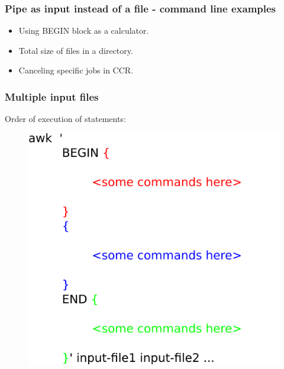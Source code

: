 \documentclass[xcolor=svgnames]{beamer}
\begin{document}
\begin{frame}
    \frametitle{Pipe as input instead of a file - command line examples}
    \begin{itemize}
        \item Using BEGIN block as a calculator.
        \item Total size of files in a directory.
        \item Canceling specific jobs in CCR.
    \end{itemize}
\end{frame}

\begin{frame}
    \frametitle{Multiple input files}
    Order of execution of statements:
    \begin{figure}
        \centering
        \includegraphics[scale=0.32,keepaspectratio]{awkMultipleInput.png}
    \end{figure}

\end{frame}
\end{document}
